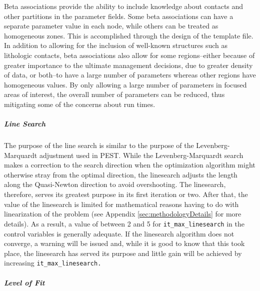 \documentclass[11pt,oneside,onecolumn]{usgsreport}
\begin{document}
\begin{multicols}{2}
\begin{bibunit}
Beta associations provide the ability to include knowledge about contacts
and other partitions in the parameter fields. Some beta associations
can have a separate parameter value in each node, while others can
be treated as homogeneous zones. This is accomplished through the
design of the template file. In addition to allowing for the inclusion
of well-known structures such as lithologic contacts, beta associations
also allow for some regions--either because of greater importance
to the ultimate management decisions, due to greater density of data,
or both--to have a large number of parameters whereas other regions
have homogeneous values. By only allowing a large number of parameters
in focused areas of interest, the overall number of parameters can
be reduced, thus mitigating some of the concerns about run times.


\subparagraph*{Line Search}

The purpose of the line search is similar to the purpose of the Levenberg-Marquardt
adjustment used in PEST. While the Levenberg-Marquardt search makes
a correction to the search direction when the optimization algorithm
might otherwise stray from the optimal direction, the linesearch adjusts
the length along the Quasi-Newton direction to avoid overshooting.
The linesearch, therefore, serves its greatest purpose in its first
iteration or two. After that, the value of the linesearch is limited
for mathematical reasons having to do with linearization of the problem
(see Appendix \ref{sec:methodologyDetails} for more details). As
a result, a value of between 2 and 5 for \texttt{it\_max\_linesearch}
in the control variables is generally adequate. If the linesearch
algorithm does not converge, a warning will be issued and, while it
is good to know that this took place, the linesearch has served its
purpose and little gain will be achieved by increasing \texttt{it\_max\_linesearch.}


\subparagraph*{Level of Fit}


\end{bibunit}
\end{multicols}
\end{document}
